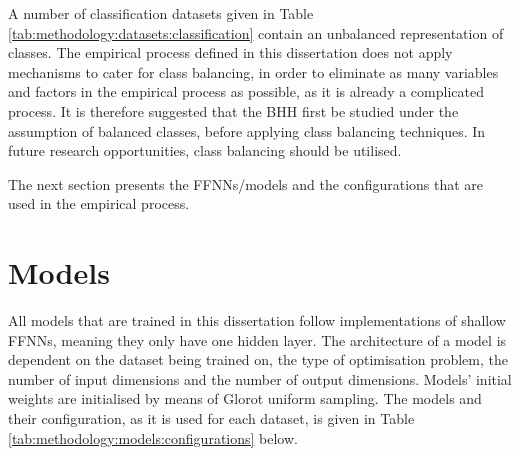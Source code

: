 A number of classification datasets given in Table \ref{tab:methodology:datasets:classification} contain an unbalanced representation of classes. The empirical process defined in this dissertation does not apply mechanisms to cater for class balancing, in order to eliminate as many variables and factors in the empirical process as possible, as it is already a complicated process.  It is therefore suggested that the \acs{BHH} first be studied under the assumption of balanced classes, before applying class balancing techniques. In future research opportunities, class balancing should be utilised.

The next section presents the \acp{FFNN}/models and the configurations that are used in the empirical process.

\section{Models}\label{sec:methodology:model}

All models that are trained in this dissertation follow implementations of shallow \acp{FFNN}, meaning they only have one hidden layer. The architecture of a model is dependent on the dataset being trained on, the type of optimisation problem, the number of input dimensions and the number of output dimensions. Models' initial weights are initialised by means of Glorot uniform sampling. The models and their configuration, as it is used for each dataset, is given in Table \ref{tab:methodology:models:configurations} below.


